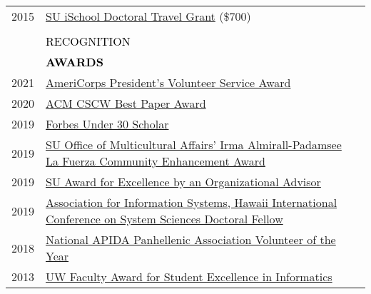 \documentclass[11pt]{article}
\begin{document}
{{\begin{longtable}{Rp{0.75in}p{5.0in}}
\footnotesize{2015} & \href{https://ischool.syr.edu/research/grants-and-awards/}{{SU iSchool Doctoral Travel Grant}} (\$700)\\

\\

\sout{\hfill} 
& \par \Large \textcolor{black}{\uppercase{Recognition\hspace{6pt} \sout{\hfill}}}\\

& \textcolor{black}{\uppercase{\textbf{Awards}}}\\

\footnotesize{2021} & 
\href{https://www.presidentialserviceawards.gov/}{{AmeriCorps President's Volunteer Service Award}}\\

\footnotesize{2020} & 
\href{https://cscw.acm.org/2020/awards/}{{ACM CSCW Best Paper Award}}\\

\footnotesize{2019} & 
\href{https://www.forbes.com/sites/forbespr/2017/09/12/forbes-under-30-scholars-program-focused-on-diversity-and-inclusion-offers-1000-college-students-access-to-2017-forbes-under-30-summit/}{{Forbes Under 30 Scholar}}\\

\footnotesize{2019} & 
\href{https://news.syr.edu/blog/2019/04/29/44-stars-of-excellence-awards-honor-members-of-campus-community/}{{SU Office of Multicultural Affairs' Irma Almirall-Padamsee La Fuerza Community Enhancement Award}}\\

\footnotesize{2019} &\href{https://news.syr.edu/blog/2019/04/29/44-stars-of-excellence-awards-honor-members-of-campus-community/}{{SU Award for Excellence by an Organizational Advisor}}\\

\footnotesize{2019} &
\href{https://www.twitter.com/bdosono/status/1082439167512961024}{{Association for Information Systems, Hawaii International Conference on System Sciences Doctoral Fellow}}\\

\footnotesize{2018} &
\href{http://www.napahq.org/2018-napa-standards-of-excellence-award-recipients/}{{National APIDA Panhellenic Association Volunteer of the Year}}\\

\footnotesize{2013} & \href{https://ischool.uw.edu/news/2016/12/2013-ischool-convocation-celebrates-achievement-and-community}{{UW Faculty Award for Student Excellence in Informatics}}\\


\end{longtable}}}
\end{document}
